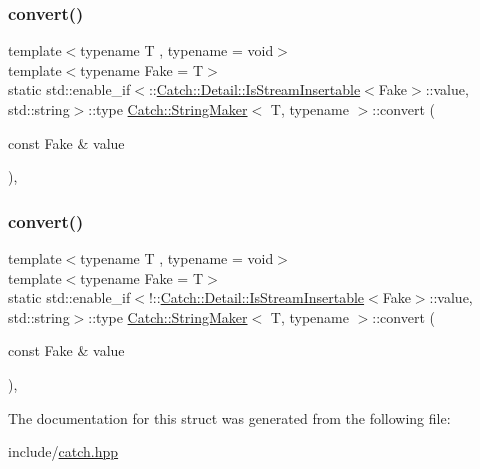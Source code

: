 \subsubsection{\texorpdfstring{convert()}{convert()}\hspace{0.1cm}{\footnotesize\ttfamily [1/2]}}
{\footnotesize\ttfamily template$<$typename T , typename  = void$>$ \\
template$<$typename Fake  = T$>$ \\
static std\+::enable\+\_\+if$<$\+::\mbox{\hyperlink{class_catch_1_1_detail_1_1_is_stream_insertable}{Catch\+::\+Detail\+::\+Is\+Stream\+Insertable}}$<$Fake$>$\+::value, std\+::string$>$\+::type \mbox{\hyperlink{struct_catch_1_1_string_maker}{Catch\+::\+String\+Maker}}$<$ T, typename $>$\+::convert (\begin{DoxyParamCaption}\item[{const Fake \&}]{value }\end{DoxyParamCaption})\hspace{0.3cm}{\ttfamily [inline]}, {\ttfamily [static]}}

\mbox{\label{struct_catch_1_1_string_maker_a68bb548de0e5ad364228b1ca3dd2f561}} 
\subsubsection{\texorpdfstring{convert()}{convert()}\hspace{0.1cm}{\footnotesize\ttfamily [2/2]}}
{\footnotesize\ttfamily template$<$typename T , typename  = void$>$ \\
template$<$typename Fake  = T$>$ \\
static std\+::enable\+\_\+if$<$!\+::\mbox{\hyperlink{class_catch_1_1_detail_1_1_is_stream_insertable}{Catch\+::\+Detail\+::\+Is\+Stream\+Insertable}}$<$Fake$>$\+::value, std\+::string$>$\+::type \mbox{\hyperlink{struct_catch_1_1_string_maker}{Catch\+::\+String\+Maker}}$<$ T, typename $>$\+::convert (\begin{DoxyParamCaption}\item[{const Fake \&}]{value }\end{DoxyParamCaption})\hspace{0.3cm}{\ttfamily [inline]}, {\ttfamily [static]}}



The documentation for this struct was generated from the following file\+:\begin{DoxyCompactItemize}
\item 
include/\mbox{\hyperlink{catch_8hpp}{catch.\+hpp}}\end{DoxyCompactItemize}
